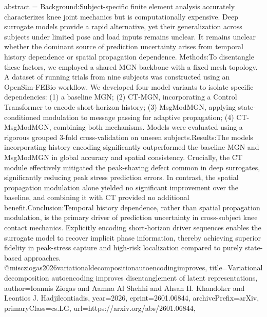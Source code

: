 {      abstract = {Background:Subject-specific finite element analysis accurately characterizes knee joint mechanics but is computationally expensive. Deep surrogate models provide a rapid alternative, yet their generalization across subjects under limited pose and load inputs remains unclear. It remains unclear whether the dominant source of prediction uncertainty arises from temporal history dependence or spatial propagation dependence. Methods:To disentangle these factors, we employed a shared MGN backbone with a fixed mesh topology. A dataset of running trials from nine subjects was constructed using an OpenSim-FEBio workflow. We developed four model variants to isolate specific dependencies: (1) a baseline MGN; (2) CT-MGN, incorporating a Control Transformer to encode short-horizon history; (3) MsgModMGN, applying state-conditioned modulation to message passing for adaptive propagation; (4) CT-MsgModMGN, combining both mechanisms. Models were evaluated using a rigorous grouped 3-fold cross-validation on unseen subjects.Results:The models incorporating history encoding significantly outperformed the baseline MGN and MsgModMGN in global accuracy and spatial consistency. Crucially, the CT module effectively mitigated the peak-shaving defect common in deep surrogates, significantly reducing peak stress prediction errors. In contrast, the spatial propagation modulation alone yielded no significant improvement over the baseline, and combining it with CT provided no additional benefit.Conclusion:Temporal history dependence, rather than spatial propagation modulation, is the primary driver of prediction uncertainty in cross-subject knee contact mechanics. Explicitly encoding short-horizon driver sequences enables the surrogate model to recover implicit phase information, thereby achieving superior fidelity in peak-stress capture and high-risk localization compared to purely state-based approaches.}
}@misc{ziogas2026variationaldecompositionautoencodingimproves,
      title={Variational decomposition autoencoding improves disentanglement of latent representations}, 
      author={Ioannis Ziogas and Aamna Al Shehhi and Ahsan H. Khandoker and Leontios J. Hadjileontiadis},
      year={2026},
      eprint={2601.06844},
      archivePrefix={arXiv},
      primaryClass={cs.LG},
      url={https://arxiv.org/abs/2601.06844},
}
